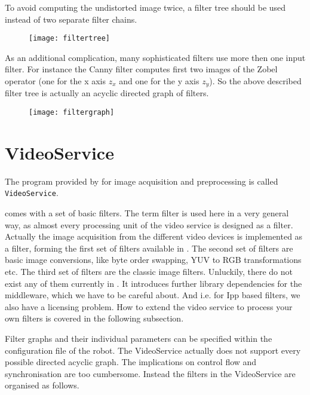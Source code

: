 To avoid computing the undistorted image twice, a filter tree should
be used instead of two separate filter chains.

\begin{figure}[!ht]
  \begin{center}
    \texttt{[image: filtertree]}
  \end{center}
\end{figure}

As an additional complication, many sophisticated filters use more
then one input filter. For instance the Canny filter computes first
two images of the Zobel operator (one for the x axis $z_x$ and one for the y
axis $z_y$). So the above described filter tree is actually an acyclic
directed graph of filters.

\begin{figure}[!ht]
  \begin{center}
    \texttt{[image: filtergraph]}
  \end{center}
\end{figure}

\section{VideoService}

The program provided by \miro for image acquisition and preprocessing
is called {\tt VideoService}.

\miro comes with a set of basic filters. The term filter is used here
in a very general way, as almost every processing unit of the video
service is designed as a filter. Actually the image acquisition from
the different video devices is implemented as a filter, forming the
first set of filters available in \miro. The second set of filters are
basic image conversions, like byte order swapping, YUV to RGB
transformations etc. The third set of filters are the classic image
filters. Unluckily, there do not exist any of them currently in \miro.
It introduces further library dependencies for the middleware, which
we have to be careful about. And i.e. for Ipp based filters, we also
have a licensing problem. How to extend the video service to process
your own filters is covered in the following subsection.

Filter graphs and their individual parameters can be specified within
the configuration file of the robot. The VideoService actually does
not support every possible directed acyclic graph. The implications on
control flow and synchronisation are too cumbersome. Instead the
filters in the VideoService are organised as follows.

